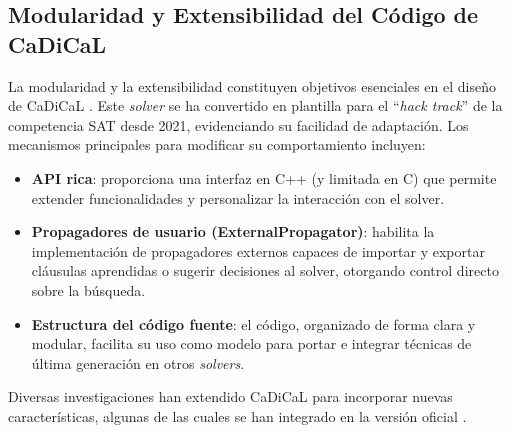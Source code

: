 \subsection{Modularidad y Extensibilidad del Código de CaDiCaL}
La modularidad y la extensibilidad constituyen objetivos esenciales en el diseño de CaDiCaL \cite{cadical2024}.
Este \textit{solver} se ha convertido en plantilla para el ``\textit{hack track}'' de la competencia SAT desde 2021, evidenciando su facilidad de adaptación. Los mecanismos principales para modificar su comportamiento incluyen:
\begin{itemize}
  \item \textbf{API rica}: proporciona una interfaz en C++ (y limitada en C) que permite extender funcionalidades y personalizar la interacción con el solver.
  \item \textbf{Propagadores de usuario (ExternalPropagator)}: habilita la implementación de propagadores externos capaces de importar y exportar cláusulas aprendidas o sugerir decisiones al solver, otorgando control directo sobre la búsqueda.
  \item \textbf{Estructura del código fuente}: el código, organizado de forma clara y modular, facilita su uso como modelo para portar e integrar técnicas de última generación en otros \textit{solvers}.
\end{itemize}
Diversas investigaciones han extendido CaDiCaL para incorporar nuevas características, algunas de las cuales se han integrado en la versión oficial \cite{cadical2024}.

